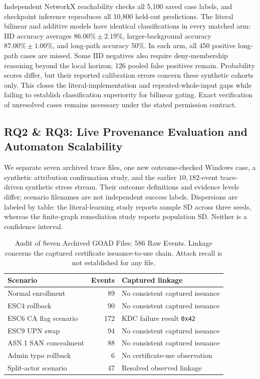 

Independent NetworkX reachability checks all 5,100 saved case labels, and checkpoint inference reproduces all 10,800 held-out predictions. The literal bilinear and additive models have identical classifications in every matched arm: IID accuracy averages $86.00\%\pm2.19\%$, larger-background accuracy $87.00\%\pm1.00\%$, and long-path accuracy 50\%. In each arm, all 450 positive long-path cases are missed. Some IID negatives also require deny-membership reasoning beyond the local horizon; 126 pooled false positives remain. Probability scores differ, but their reported calibration errors concern these synthetic cohorts only. This closes the literal-implementation and repeated-whole-input gaps while failing to establish classification superiority for bilinear gating. Exact verification of unresolved cases remains necessary under the stated permission contract.

\subsection{RQ2 \& RQ3: Live Provenance Evaluation and Automaton Scalability}
We separate seven archived trace files, one new outcome-checked Windows case, a synthetic attribution confirmation study, and the earlier $10,182$-event trace-driven synthetic stress stream. Their outcome definitions and evidence levels differ; scenario filenames are not independent success labels. Dispersions are labeled by table: the literal-learning study reports sample SD across three seeds, whereas the finite-graph remediation study reports population SD. Neither is a confidence interval.

\begin{table}[tbp]
\centering
\caption{Audit of Seven Archived GOAD Files: 586 Raw Events. Linkage concerns the captured certificate issuance-to-use chain. Attack recall is not established for any file.}
\label{tab:live_traces}
\evidencetable
\setlength{\tabcolsep}{2pt}
\begin{tabularx}{\linewidth}{@{}>{\raggedright\arraybackslash}p{.32\linewidth}rY@{}}
\toprule
Scenario & Events & Captured linkage \\
\midrule
Normal enrollment & 89 & No consistent captured issuance \\
ESC4 rollback & 90 & No consistent captured issuance \\
ESC6 CA flag scenario & 172 & KDC failure result \texttt{0x42} \\
ESC9 UPN swap & 94 & No consistent captured issuance \\
ASN.1 SAN concealment & 88 & No consistent captured issuance \\
Admin typo rollback & 6 & No certificate-use observation \\
Split-actor scenario & 47 & Resolved observed linkage \\
\bottomrule
\end{tabularx}
\end{table}

